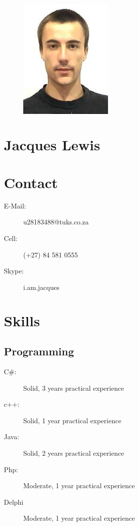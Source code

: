 

%

\begin{center}
	\begin{figure}[H]
		\centering
		\includegraphics[height=6cm]{jacques}
	\end{figure}
\end{center}

\section*
{
	\Huge{Jacques Lewis}
}
\vspace{0.5cm}

\section*{Contact}
	\begin{description}
		\item[E-Mail:] u28183488@tuks.co.za
		\item[Cell:] (+27) 84 581 0555
		\item[Skype:] i.am.jacques
	\end{description}

\section*{Skills}

	\subsection*{Programming}
		\begin{description}
			\item[C\#:]Solid, 3 years practical experience
			\item[c++:]Solid, 1 year practical experience
			\item[Java:]Solid, 2 years practical experience
			\item[Php:]Moderate, 1 year practical experience
			\item[Delphi]Moderate, 1 year practical experience
		\end{description}
